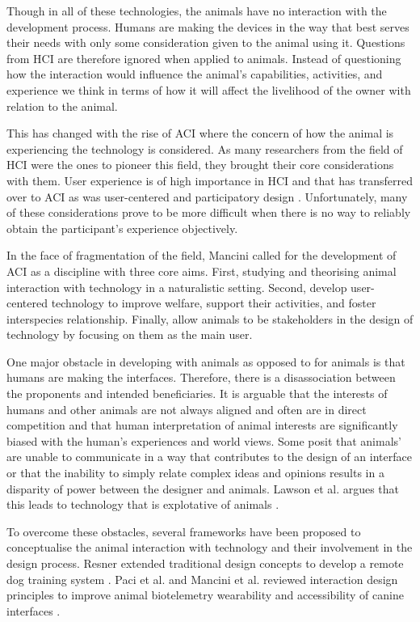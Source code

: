 \documentclass{sigchi}
\begin{document}
        Though in all of these technologies, the animals have no interaction with the development process. Humans are making the devices in the way that best serves their needs with only some consideration given to the animal using it. Questions from HCI are therefore ignored when applied to animals. Instead of questioning how the interaction would influence the animal’s capabilities, activities, and experience we think in terms of how it will affect the livelihood of the owner with relation to the animal.
        
        This has changed with the rise of ACI where the concern of how the animal is experiencing the technology is considered. As many researchers from the field of HCI were the ones to pioneer this field, they brought their core considerations with them. User experience is of high importance in HCI and that has transferred over to ACI as was user-centered and participatory design \cite{Forlizzi2004,10.1007/978-3-642-15231-3_11,Muller1993}. Unfortunately, many of these considerations prove to be more difficult when there is no way to reliably obtain the participant’s experience objectively.
        
        In the face of fragmentation of the field, Mancini called for the development of ACI as a discipline with three core aims. First, studying and theorising animal interaction with technology in a naturalistic setting. Second, develop user-centered technology to improve welfare, support their activities, and foster interspecies relationship. Finally, allow animals to be stakeholders in the design of technology by focusing on them as the main user.
        
        One major obstacle in developing with animals as opposed to for animals is that humans are making the interfaces. Therefore, there is a disassociation between the proponents and intended beneficiaries. It is arguable that the interests of humans and other animals are not always aligned and often are in direct competition and that human interpretation of animal interests are significantly biased with the human’s experiences and world views. Some posit that animals’ are unable to communicate in a way that contributes to the design of an interface or that the inability to simply relate complex ideas and opinions results in a disparity of power between the designer and animals. Lawson et al. argues that this leads to technology that is explotative of animals \cite{Lawson:2015:PUT:2702123.2702260}.
        
        To overcome these obstacles, several frameworks have been proposed to conceptualise the animal interaction with technology and their involvement in the design process. Resner extended traditional design concepts to develop a remote dog training system \cite{Resner2001}. Paci et al. and Mancini et al. reviewed interaction design principles to improve animal biotelemetry wearability and accessibility of canine interfaces \cite{Paci2016, Mancini:2011:AIM:1978822.1978836}.
\end{document}
